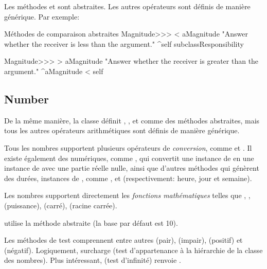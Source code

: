 \documentclass[a4paper,10pt,twoside]{book}
\begin{document}
Les méthodes  et  sont abstraites. Les autres opérateurs sont définis de manière générique. Par exemple:

\begin{method}{Méthodes de comparaison abstraites}
Magnitude>>> < aMagnitude 
    "Answer whether the receiver is less than the argument."
    ^self subclassResponsibility

Magnitude>>> > aMagnitude 
    "Answer whether the receiver is greater than the argument."
    ^aMagnitude < self
\end{method}

\subsection{Number}

De la même manière, la classe  définit , ,  et  comme des méthodes abstraites, mais tous les autres opérateurs arithmétiques sont définis de manière générique.

Tous les nombres supportent plusieurs opérateurs de  \emph{conversion}, comme  et . Il existe également des  numériques,
comme , qui convertit une instance de  en
une instance de  avec une partie réelle nulle, ainsi
que d'autres méthodes qui génèrent des durées, instances de
, comme , 
et 
(respectivement: heure, jour et semaine).

Les nombres supportent directement les \emph{fonctions
  mathématiques} telles que ,
,  
(puissance),
(carré),
(racine carrée).

 utilise la méthode abstraite
 (la base par défaut est 10).

Les méthodes de test comprennent entre autres 
(pair), 
(impair), 
(positif)
 et 
(négatif).
Logiquement,  surcharge  
(test d'appartenance à la hiérarchie de la classe des nombres).
Plus intéressant,  
(test d'infinité)
renvoie .
\end{document}
